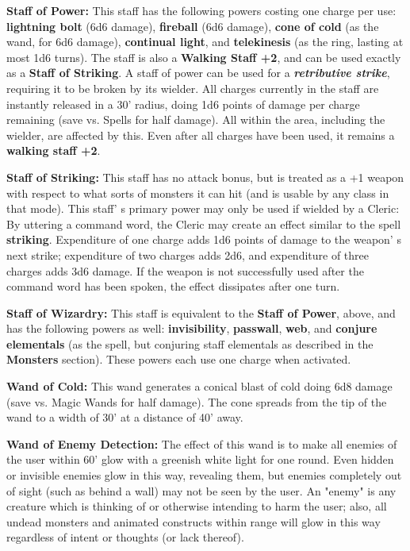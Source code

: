 \documentclass[a4paper,twoside,openany,10pt]{book}
\begin{document}
\begin{multicols}{2}
\textbf{Staff of Power:} This staff has the following powers costing one charge per use: \textbf{lightning bolt }(6d6 damage), \textbf{fireball} (6d6 damage), \textbf{cone of cold} (as the wand, for 6d6 damage), \textbf{continual light}, and \textbf{telekinesis} (as the ring, lasting at most 1d6 turns). The staff is also a \textbf{Walking Staff +2}, and can be used exactly as a \textbf{Staff of Striking}. A staff of power can be used for a \emph{\textbf{retributive strike}}, requiring it to be broken by its wielder. All charges currently in the staff are instantly released in a 30' radius, doing 1d6 points of damage per charge remaining (save vs. Spells for half damage). All within the area, including the wielder, are affected by this. Even after all charges have been used, it remains a \textbf{walking staff +2}.

\textbf{Staff of Striking:} This staff has no attack bonus, but is treated as a +1 weapon with respect to what sorts of monsters it can hit (and is usable by any class in that mode). This staff' s primary power may only be used if wielded by a Cleric: By uttering a command word, the Cleric may create an effect similar to the spell \textbf{striking}. Expenditure of one charge adds 1d6 points of damage to the weapon' s next strike; expenditure of two charges adds 2d6, and expenditure of three charges adds 3d6 damage. If the weapon is not successfully used after the command word has been spoken, the effect dissipates after one turn.

\textbf{Staff of Wizardry:} This staff is equivalent to the\textbf{ Staff of Power}, above, and has the following powers as well: \textbf{invisibility}, \textbf{passwall}, \textbf{web}, and \textbf{conjure elementals }(as the spell, but conjuring staff elementals as described in the \textbf{Monsters} section). These powers each use one charge when activated.

\textbf{Wand of Cold:} This wand generates a conical blast of cold doing 6d8 damage (save vs. Magic Wands for half damage). The cone spreads from the tip of the wand to a width of 30' at a distance of 40' away.

\textbf{Wand of Enemy Detection:} The effect of this wand is to make all enemies of the user within 60' glow with a greenish white light for one round. Even hidden or invisible enemies glow in this way, revealing them, but enemies completely out of sight (such as behind a wall) may not be seen by the user. An "enemy" is any creature which is thinking of or otherwise intending to harm the user; also, all undead monsters and animated constructs within range will glow in this way regardless of intent or thoughts (or lack thereof).


\end{multicols}
\end{document}
